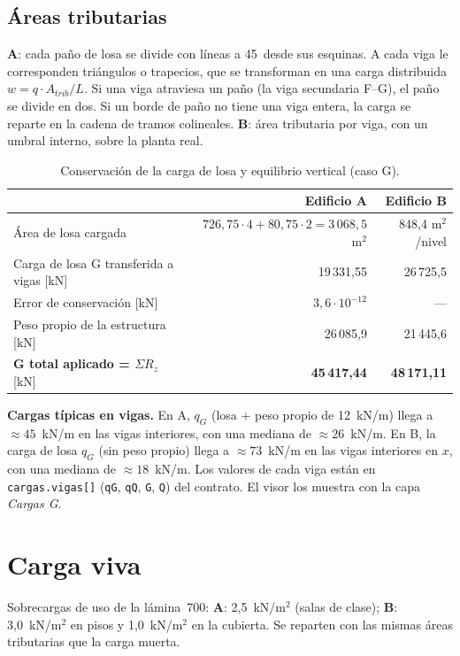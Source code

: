 \documentclass[11pt,a4paper]{article}
\begin{document}
\subsection{Áreas tributarias}

\textbf{A}: cada paño de losa se divide con líneas a 45\textdegree\ desde sus
esquinas. A cada viga le corresponden triángulos o trapecios, que se transforman
en una carga distribuida $w = q\cdot A_{trib}/L$. Si una viga atraviesa un paño
(la viga secundaria F--G), el paño se divide en dos. Si un borde de paño no
tiene una viga entera, la carga se reparte en la cadena de tramos colineales.
\textbf{B}: área tributaria por viga, con un umbral interno, sobre la planta
real.

\begin{table}[h]
\centering
\caption{Conservación de la carga de losa y equilibrio vertical (caso G).}
\begin{tabular}{lrr}
\toprule
 & Edificio A & Edificio B \\
\midrule
Área de losa cargada & $726{,}75\cdot4 + 80{,}75\cdot2 = 3\,068{,}5$~m$^2$ & 848,4 m$^2$/nivel \\
Carga de losa G transferida a vigas [kN] & 19\,331,55 & 26\,725,5 \\
Error de conservación [kN] & $3{,}6\cdot10^{-12}$ & --- \\
Peso propio de la estructura [kN] & 26\,085,9 & 21\,445,6 \\
\textbf{G total aplicado = $\Sigma R_z$} [kN] & \textbf{45\,417,44} & \textbf{48\,171,11} \\
\bottomrule
\end{tabular}
\end{table}

\textbf{Cargas típicas en vigas.} En A, $q_G$ (losa + peso propio de 12~kN/m)
llega a $\approx 45$~kN/m en las vigas interiores, con una mediana de
$\approx 26$~kN/m. En B, la carga de losa $q_G$ (sin peso propio) llega a
$\approx 73$~kN/m en las vigas interiores en $x$, con una mediana de
$\approx 18$~kN/m. Los valores de cada viga están en \texttt{cargas.vigas[]}
(\texttt{qG}, \texttt{qQ}, \texttt{G}, \texttt{Q}) del contrato. El visor los
muestra con la capa \emph{Cargas G}.

\section{Carga viva}

Sobrecargas de uso de la lámina~700: \textbf{A}: 2,5~kN/m$^2$ (salas de
clase); \textbf{B}: 3,0~kN/m$^2$ en pisos y 1,0~kN/m$^2$ en la cubierta. Se
reparten con las mismas áreas tributarias que la carga muerta.
\end{document}
